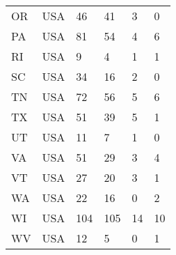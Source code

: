 \begin{supertabular}{p{0.3\columnwidth}p{0.3\columnwidth}p{0.05\columnwidth}p{0.05\columnwidth}p{0.05\columnwidth}p{0.05\columnwidth}}
            OR &              USA &   46 &   41 &   3 &   0 \\
            PA &              USA &   81 &   54 &   4 &   6 \\
            RI &              USA &    9 &    4 &   1 &   1 \\
            SC &              USA &   34 &   16 &   2 &   0 \\
            TN &              USA &   72 &   56 &   5 &   6 \\
            TX &              USA &   51 &   39 &   5 &   1 \\
            UT &              USA &   11 &    7 &   1 &   0 \\
            VA &              USA &   51 &   29 &   3 &   4 \\
            VT &              USA &   27 &   20 &   3 &   1 \\
            WA &              USA &   22 &   16 &   0 &   2 \\
            WI &              USA &  104 &  105 &  14 &  10 \\
            WV &              USA &   12 &    5 &   0 &   1 \\
\end{supertabular}
